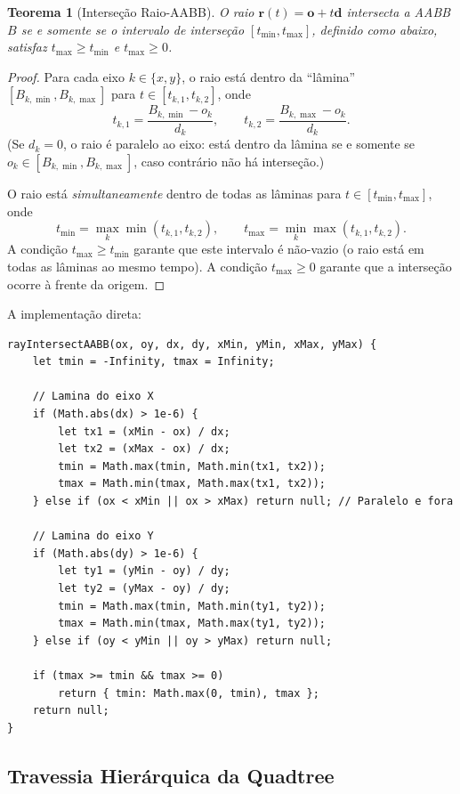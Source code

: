 \documentclass[11pt,a4paper]{article}
\theoremstyle{plain}
\newtheorem{theorem}{Teorema}[section]
\theoremstyle{definition}
\newcommand{\vv}[1]{\mathbf{#1}}
\begin{document}
\begin{theorem}[Interseção Raio-AABB]
O raio $\vv{r}(t) = \vv{o} + t\vv{d}$ intersecta a AABB $B$ se e somente se
o intervalo de interseção $[t_{\min}, t_{\max}]$, definido como abaixo, satisfaz
$t_{\max} \geq t_{\min}$ e $t_{\max} \geq 0$.
\end{theorem}

\begin{proof}
Para cada eixo $k \in \{x, y\}$, o raio está dentro da ``lâmina''
$[B_{k,\min}, B_{k,\max}]$ para $t \in [t_{k,1}, t_{k,2}]$, onde
\[
    t_{k,1} = \frac{B_{k,\min} - o_k}{d_k}, \qquad
    t_{k,2} = \frac{B_{k,\max} - o_k}{d_k}.
\]
(Se $d_k = 0$, o raio é paralelo ao eixo: está dentro da lâmina se e somente se
$o_k \in [B_{k,\min}, B_{k,\max}]$, caso contrário não há interseção.)

O raio está \emph{simultaneamente} dentro de todas as lâminas para
$t \in [t_{\min}, t_{\max}]$, onde
\[
    t_{\min} = \max_k \min(t_{k,1}, t_{k,2}), \qquad
    t_{\max} = \min_k \max(t_{k,1}, t_{k,2}).
\]
A condição $t_{\max} \geq t_{\min}$ garante que este intervalo é não-vazio (o
raio está em todas as lâminas ao mesmo tempo). A condição $t_{\max} \geq 0$
garante que a interseção ocorre à frente da origem.
\end{proof}

A implementação direta:
\begin{lstlisting}
rayIntersectAABB(ox, oy, dx, dy, xMin, yMin, xMax, yMax) {
    let tmin = -Infinity, tmax = Infinity;

    // Lamina do eixo X
    if (Math.abs(dx) > 1e-6) {
        let tx1 = (xMin - ox) / dx;
        let tx2 = (xMax - ox) / dx;
        tmin = Math.max(tmin, Math.min(tx1, tx2));
        tmax = Math.min(tmax, Math.max(tx1, tx2));
    } else if (ox < xMin || ox > xMax) return null; // Paralelo e fora

    // Lamina do eixo Y
    if (Math.abs(dy) > 1e-6) {
        let ty1 = (yMin - oy) / dy;
        let ty2 = (yMax - oy) / dy;
        tmin = Math.max(tmin, Math.min(ty1, ty2));
        tmax = Math.min(tmax, Math.max(ty1, ty2));
    } else if (oy < yMin || oy > yMax) return null;

    if (tmax >= tmin && tmax >= 0)
        return { tmin: Math.max(0, tmin), tmax };
    return null;
}
\end{lstlisting}

\subsection{Travessia Hierárquica da Quadtree}
\label{subsec:traversal}
\end{document}
